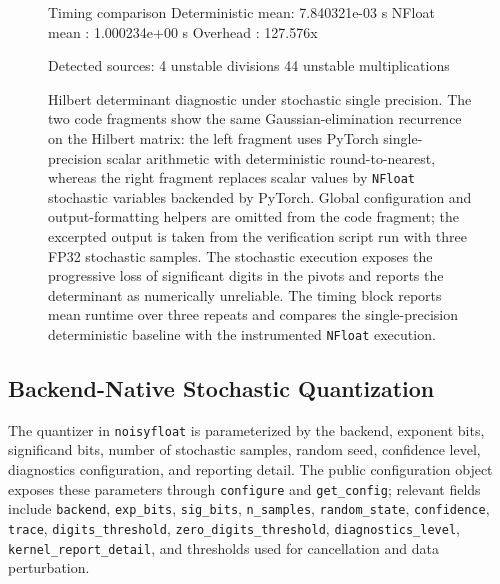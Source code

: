 \documentclass[manuscript, screen]{acmart}
\begin{document}
\begin{figure}[htp]
\begin{minipage}[t]{0.36\linewidth}
\begin{codeoutput}{Timing comparison}
Deterministic mean: 7.840321e-03 s
NFloat mean : 1.000234e+00 s
Overhead : 127.576x

Detected sources:
4 unstable divisions
44 unstable multiplications
\end{codeoutput}
\end{minipage}
\caption{Hilbert determinant diagnostic under stochastic single precision. The two code fragments show the same Gaussian-elimination recurrence on the Hilbert matrix: the left fragment uses PyTorch single-precision scalar arithmetic with deterministic round-to-nearest, whereas the right fragment replaces scalar values by \texttt{NFloat} stochastic variables backended by PyTorch. Global configuration and output-formatting helpers are omitted from the code fragment; the excerpted output is taken from the verification script run with three FP32 stochastic samples. The stochastic execution exposes the progressive loss of significant digits in the pivots and reports the determinant as numerically unreliable. The timing block reports mean runtime over three repeats and compares the single-precision deterministic baseline with the instrumented \texttt{NFloat} execution.}
\label{fig:hilbert-determinant-demo-th}
\end{figure}




\subsection{Backend-Native Stochastic Quantization}

The quantizer in \texttt{noisyfloat} is parameterized by the backend, exponent bits, significand bits, number of stochastic samples, random seed, confidence level, diagnostics configuration, and reporting detail. The public configuration object exposes these parameters through \texttt{configure} and \texttt{get\_config}; relevant fields include \texttt{backend}, \texttt{exp\_bits}, \texttt{sig\_bits}, \texttt{n\_samples}, \texttt{random\_state}, \texttt{confidence}, \texttt{trace}, \texttt{digits\_threshold}, \texttt{zero\_digits\_threshold}, \texttt{diagnostics\_level}, \texttt{kernel\_report\_detail}, and thresholds used for cancellation and data perturbation.
\end{document}
